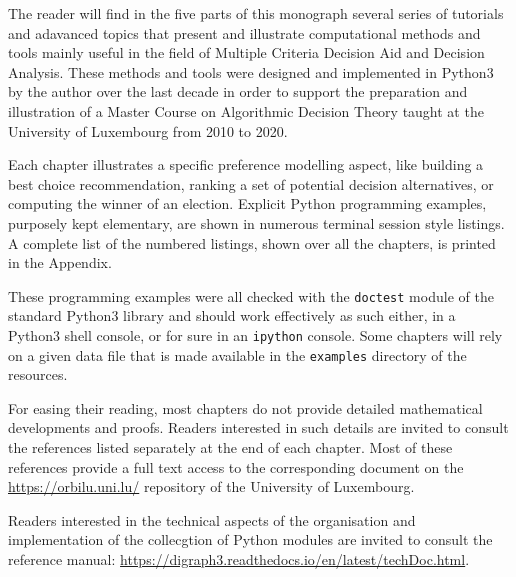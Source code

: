 \label{sec:0}



{}
\label{sec:0.1}

The reader will find in the five parts of this monograph several series of tutorials and adavanced topics that present and illustrate computational methods and tools mainly useful in the field of Multiple Criteria Decision Aid and Decision Analysis. These methods and tools were designed and implemented in Python3 by the author over the last decade in order to support the preparation and illustration of a Master Course on Algorithmic Decision Theory taught at the University of Luxembourg from 2010 to 2020.

Each chapter illustrates a specific preference modelling aspect, like building a best choice recommendation, ranking a set of potential decision alternatives, or computing the winner of an election. Explicit Python programming examples, purposely kept elementary, are shown in numerous terminal session style listings. A complete list of the numbered listings, shown over all the chapters, is printed in the Appendix. 

These programming examples were all checked with the \texttt{doctest} module of the standard Python3 library and should work effectively as such either, in a Python3 shell console, or for sure in an \texttt{ipython} console. Some chapters will rely on a given data file that is made available in the \texttt{examples} directory of the \Digraph resources. 

For easing their reading, most chapters do not provide detailed mathematical developments and proofs. Readers interested in such details are invited to consult the references listed separately at the end of each chapter. Most of these references provide a full text access to the corresponding document on the \href{https://orbilu.uni.lu/}{https://orbilu.uni.lu/} repository of the University of Luxembourg.

Readers interested in the technical aspects of the organisation and implementation of the collecgtion of \Digraph Python modules are invited to consult the reference manual: \href{https://digraph3.readthedocs.io/en/latest/techDoc.html}{https://digraph3.readthedocs.io/en/latest/techDoc.html}.

